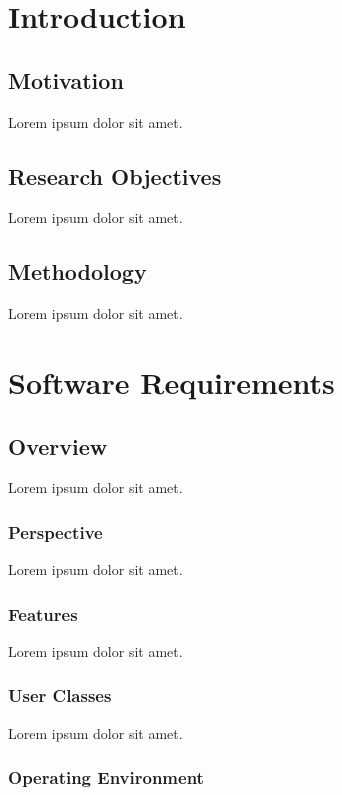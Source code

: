 \chapter{Introduction}
\label{chap:introduction}

\section{Motivation}

Lorem ipsum dolor sit amet.

\section{Research Objectives}

Lorem ipsum dolor sit amet.

\section{Methodology}

Lorem ipsum dolor sit amet.

\chapter{Software Requirements}

\section{Overview}

Lorem ipsum dolor sit amet.

\subsection{Perspective}

Lorem ipsum dolor sit amet.

\subsection{Features}

Lorem ipsum dolor sit amet.

\subsection{User Classes}

Lorem ipsum dolor sit amet.

\subsection{Operating Environment}

